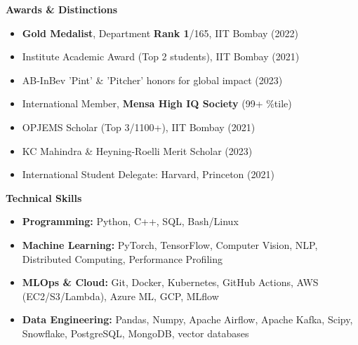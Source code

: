 \documentclass[letterpaper,10pt]{article}
\begin{document}
\titlerule
\vspace{4pt}
{\small
\begin{multicols}{2}

{\vspace{-4pt}\scshape\raggedright\large\bfseries Awards \& Distinctions}
\begin{itemize}[leftmargin=0.15in, itemsep=-2pt]
  \item \textbf{Gold Medalist}, Department \textbf{Rank 1}/165, IIT Bombay (2022)
  \item Institute Academic Award (Top 2 students), IIT Bombay (2021)
  \item AB-InBev 'Pint' \& 'Pitcher' honors for global impact (2023)
  \item International Member, \textbf{Mensa High IQ Society} (99+ \%tile)
  \item OPJEMS Scholar  (Top 3/1100+), IIT Bombay (2021)
  \item KC Mahindra \& Heyning-Roelli Merit Scholar  (2023)
  \item International Student Delegate: Harvard, Princeton (2021)
\end{itemize}

\columnbreak

{\vspace{-4pt} \scshape\raggedright\large\bfseries Technical Skills}
\begin{itemize}[leftmargin=0.15in]
  \item \textbf{Programming:} Python, C++, SQL, Bash/Linux 
  \item \textbf{Machine Learning:} PyTorch, TensorFlow, Computer Vision, NLP, Distributed Computing, Performance Profiling
  \item \textbf{MLOps \& Cloud:} Git, Docker, Kubernetes, GitHub Actions, AWS (EC2/S3/Lambda), Azure ML, GCP, MLflow
  \item \textbf{Data Engineering:} Pandas, Numpy, Apache Airflow, Apache Kafka, Scipy, Snowflake, PostgreSQL, MongoDB, vector databases
\end{itemize}
\end{multicols}
}

\end{document}
